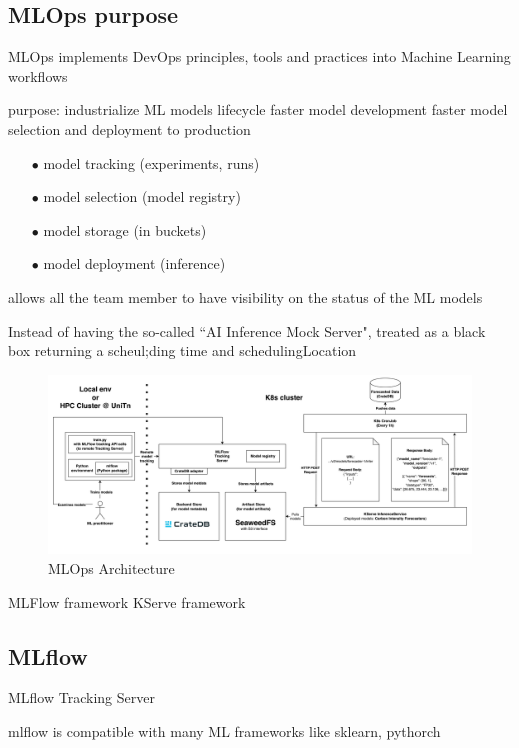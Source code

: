 \subsection{MLOps purpose}

MLOps implements DevOps principles, tools and practices into Machine Learning workflows 

purpose: industrialize ML models lifecycle
faster model development
faster model selection and deployment to production

\begin{itemize}[itemsep=0.2pt, topsep=1pt]
  \item[$\bullet$] model tracking (experiments, runs)
  \item[$\bullet$] model selection (model registry)
  \item[$\bullet$] model storage (in buckets)
  \item[$\bullet$] model deployment (inference)
\end{itemize}


allows all the team member to have visibility on the status of the ML models

Instead of having the so-called ``AI Inference Mock Server", treated as a black box returning a scheul;ding time and schedulingLocation

\begin{figure}[htb]
\centering
\includegraphics[width=1\linewidth]{images/mlops_workflow.png}
\caption{MLOps Architecture}
\label{fig:mlops}
\end{figure}


MLFlow framework
KServe framework


\subsection{MLflow}



MLflow Tracking Server


mlflow is compatible with many ML frameworks like sklearn, pythorch


